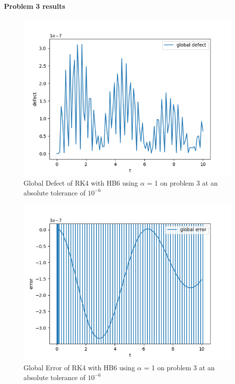 \documentclass{article}
\begin{document}
\paragraph{Problem 3 results}


\begin{figure}[H]
\centering
\includegraphics[width=0.7\linewidth]{./figures/static_alpha_rk4_with_hb6_p3_global_defect}
\caption{Global Defect of RK4 with HB6 using $\alpha$ = 1 on problem 3 at an absolute tolerance of $10^{-6}$}
\label{fig:static_alpha_rk4_with_hb6_p3_global_defect}
\end{figure}

\begin{figure}[H]
\centering
\includegraphics[width=0.7\linewidth]{./figures/static_alpha_rk4_with_hb6_p3_global_error}
\caption{Global Error of RK4 with HB6 using $\alpha$ = 1 on problem 3 at an absolute tolerance of $10^{-6}$}
\label{fig:static_alpha_rk4_with_hb6_p3_global_error}
\end{figure}
\end{document}
